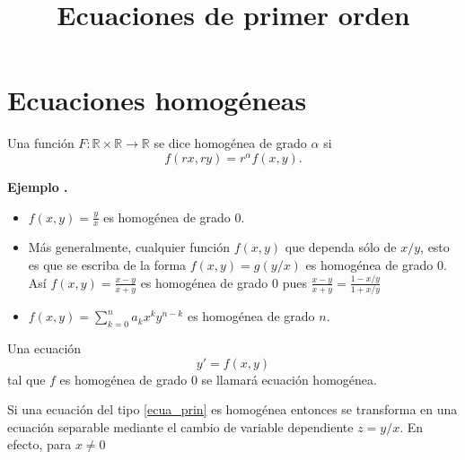 \documentclass{article}
\title{Ecuaciones de primer orden}
\newcommand{\rr}{\mathbb{R}}
\newcounter{ejemplo_cont}
\newenvironment{ejemplo}{\noindent\textbf{Ejemplo  \arabic{ejemplo_cont}.} }{\addtocounter{ejemplo_cont}{1}}
\begin{document}
  \maketitle







\tableofcontents











\section{Ecuaciones homogéneas}

\begin{definicion}
 Una función $F:\rr\times\rr\to\rr$ se dice homogénea de grado $\alpha$ si 
 \[f(rx,ry)=r^{\alpha}f(x,y).\]
\end{definicion}

\begin{ejemplo}

\begin{itemize}
                 \item $f(x,y)=\tfrac{y}{x}$ es homogénea de grado $0$.
                 \item Más generalmente, cualquier función $f(x,y)$ que dependa sólo de $x/y$, esto es que se escriba de la forma $f(x,y)=g(y/x)$
                 es homogénea de grado  $0$. Así $f(x,y)=\tfrac{x-y}{x+y}$ es homogénea de grado $0$ pues $\tfrac{x-y}{x+y}= \tfrac{1-x/y}{1+x/y}$
                 \item $f(x,y)=\sum_{k=0}^na_kx^ky^{n-k}$ es homogénea de grado $n$.
\end{itemize}
\end{ejemplo}



\begin{definicion}
 Una ecuación 
 \begin{equation}\label{ecua_prin}y'=f(x,y)\end{equation}
 tal que $f$ es homogénea de grado $0$ se llamará ecuación homogénea.
\end{definicion}

Si una ecuación del tipo \eqref{ecua_prin} es homogénea entonces se transforma en una ecuación separable mediante el cambio de variable dependiente $\boxed{z=y/x}$. En efecto, para $x\neq 0$
\end{document}
